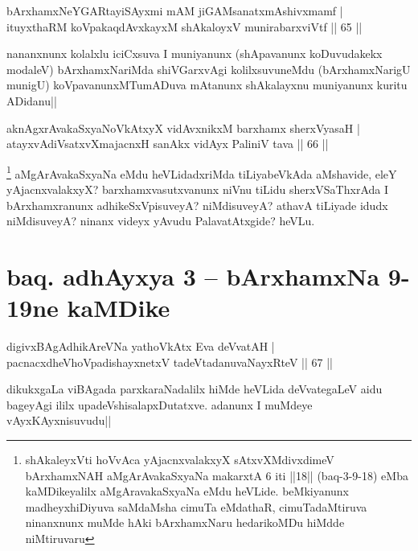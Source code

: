 
\begin{shl}
bArxhamxNeYGARtayiSAyxmi mAM jiGAMsanatxmAshivxmamf |\\
ituyxthaRM koVpakaqdAvxkayxM shAkaloyxV munirabarxviVtf \hfill || 65 ||
\end{shl}

\begin{artha}
nananxnunx kolalxlu iciCxsuva I muniyanunx (shApavanunx koDuvudakekx modaleV) bArxhamxNariMda shiVGarxvAgi kolilxsuvuneMdu (bArxhamxNarigU munigU) koVpavanunxMTumADuva mAtanunx shAkalayxnu muniyanunx kuritu ADidanu||
\end{artha}


\begin{shl}
aknAgxrAvakaSxyaNoVkAtxyX vidAvxnikxM barxhamx sherxVyasaH |\\
atayxvAdiVsatxvXmajacnxH sanAkx vidAyx PaliniV tava \hfill || 66 ||
\end{shl}

\begin{artha}
\footnote[1]{shAkaleyxVti hoVvAca yAjacnxvalakxyX sAtxvXMdivxdimeV bArxhamxNAH aMgArAvakaSxyaNa makarxtA 6 iti ||18|| (baq-3-9-18) eMba kaMDikeyalilx aMgAravakaSxyaNa eMdu heVLide. beMkiyanunx madheyxhiDiyuva saMdaMsha cimuTa eMdathaR, cimuTadaMtiruva ninanxnunx muMde hAki bArxhamxNaru hedarikoMDu hiMdde niMtiruvaru} aMgArAvakaSxyaNa eMdu heVLidadxriMda tiLiyabeVkAda aMshavide, eleY yAjacnxvalakxyX? barxhamxvasutxvanunx niVnu tiLidu sherxVSaThxrAda I bArxhamxranunx adhikeSxVpisuveyA? niMdisuveyA? athavA tiLiyade idudx niMdisuveyA? ninanx videyx yAvudu PalavatAtxgide? heVLu.
\end{artha}

\section*{baq. adhAyxya 3 -- bArxhamxNa 9-19ne kaMDike}


\begin{shl}
digivxBAgAdhikAreVNa yathoVkAtx Eva deVvatAH |\\
pacnacxdheVhoVpadishayxnetxV tadeVtadanuvaNayxRteV \hfill || 67 ||
\end{shl}

\begin{artha}
dikukxgaLa viBAgada parxkaraNadalilx hiMde heVLida deVvategaLeV aidu bageyAgi ililx upadeVshisalapxDutatxve. adanunx I muMdeye vAyxKAyxnisuvudu||
\end{artha}

